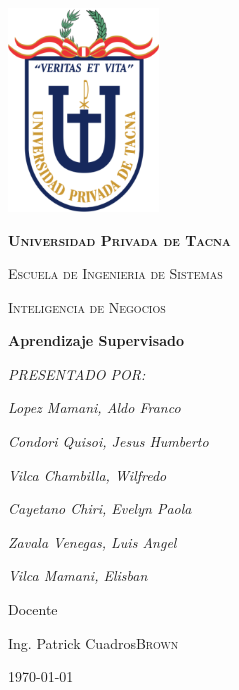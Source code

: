 \documentclass[12pt,a4paper]{report}
\begin{document}
\begin{titlepage}
	\centering
	\includegraphics[width=4cm]{./images/upt}\par\vspace{1cm}
	{\scshape\LARGE\huge\bfseries Universidad Privada de Tacna \par}
	{\scshape\LARGE Escuela de Ingenieria de Sistemas \par}
	\vspace{1cm}
	{\scshape\Large Inteligencia de Negocios\par}
	\vspace{0.5cm}
	{\huge\bfseries Aprendizaje Supervisado \par}
	\vspace{1cm}

	{\Large\itshape PRESENTADO POR:\par}
	{\Large\itshape Lopez Mamani, Aldo Franco \par}
	{\Large\itshape Condori Quisoi, Jesus Humberto\par}
	{\Large\itshape Vilca Chambilla, Wilfredo\par}
	{\Large\itshape Cayetano Chiri, Evelyn Paola\par}
	{\Large\itshape Zavala Venegas, Luis Angel\par}
	{\Large\itshape Vilca Mamani, Elisban\par}




	\vfill
	Docente\par
	Ing. Patrick Cuadros\textsc{Brown}

	\vfill

	{\large \today\par}

\end{titlepage}
\end{document}
